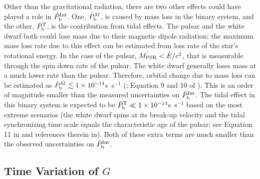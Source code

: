 Other than the gravitational radiation, there are two other effects could have played a role in
$\dot{P}_{\rm b}^{\rm Int}$. One, $\dot{P}_{\rm b}^{\dot{M}}$, is caused by mass loss in the
binary system, and the other, $\dot{P}_{\rm b}^{\rm T}$, is the contribution
from tidal effects.
The pulsar and the white dwarf both could lose mass due to their magnetic dipole radiation; the maximum
mass loss rate due to this effect can be estimated from loss rate of the
star's rotational energy. In the case of the pulsar, $\dot{M_{\rm PSR}}<\dot{E}/c^2$, that is
measurable through the spin down rate of the pulsar.
The white dwarf generally loses mass at a much lower rate than the pulsar.
Therefore, orbital change due to mass loss can be estimated as $\dot{P}_{\rm
b}^{\dot{M}}\lesssim 1\times10^{-14}$s~s$^{-1}$ (\citealt{dt91}; Equation 9 and 10
of \citealt{fwe+12}). This is an order of magnitude smaller than the measured
uncertainties on $\dot{P}_{\rm b}^{\rm Int}$.
The tidal effect in this binary system is expected to be $\dot{P}_{\rm b}^{\rm
T}\ll1\times10^{-14}$s~s$^{-1}$ based on the most extreme scenarios (the white
dwarf spins at its break-up velocity and the tidal synchronizing time scale equals the
characteristic age of the pulsar; see Equation 11 in \citealt{fwe+12} and
references therein in).
Both of these extra terms are much smaller than the observed uncertainties
on $\dot{P}_{\rm b}^{\rm Int}$.


\subsection{Time Variation of $G$}
\label{sec:Gdot}


